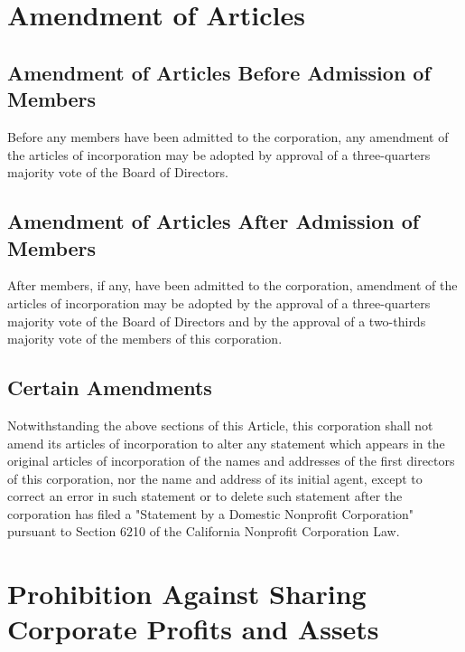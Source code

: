 \documentclass{article}
\begin{document}
	\section{Amendment of Articles}	
	\subsection{Amendment of Articles Before Admission of Members}
	Before any members have been admitted to the corporation, any amendment of the articles of incorporation may be adopted by approval of a three-quarters majority vote of the Board of Directors.
	\subsection{Amendment of Articles After Admission of Members}
	After members, if any, have been admitted to the corporation, amendment of the articles of incorporation may be adopted by the approval of a three-quarters majority vote of the Board of Directors and by the approval of a two-thirds majority vote of the members of this corporation.
	\subsection{Certain Amendments}
	Notwithstanding the above sections of this Article, this corporation shall not amend its articles of incorporation to alter any statement which appears in the original articles of incorporation of the names and addresses of the first directors of this corporation, nor the name and address of its initial agent, except to correct an error in such statement or to delete such statement after the corporation has filed a "Statement by a Domestic Nonprofit Corporation" pursuant to Section 6210 of the California Nonprofit Corporation Law.
	
	\section{Prohibition Against Sharing Corporate Profits and Assets}
\end{document}
